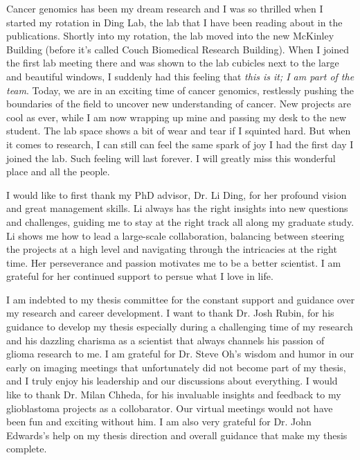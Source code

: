 \thesisacknowledgments

Cancer genomics has been my dream research and I was so thrilled when I started my rotation in Ding Lab, the lab that I have been reading about in the publications.
Shortly into my rotation, the lab moved into the new McKinley Building (before it's called Couch Biomedical Research Building).
When I joined the first lab meeting there and was shown to the lab cubicles next to the large and beautiful windows, I suddenly had this feeling that \textit{this is it; I am part of the team}.
Today, we are in an exciting time of cancer genomics, restlessly pushing the boundaries of the field to uncover new understanding of cancer.
New projects are cool as ever, while I am now wrapping up mine and passing my desk to the new student.
The lab space shows a bit of wear and tear if I squinted hard.
But when it comes to research, I can still can feel the same spark of joy I had the first day I joined the lab.
Such feeling will last forever.
I will greatly miss this wonderful place and all the people.

I would like to first thank my PhD advisor, Dr. Li Ding, for her profound vision and great management skills.
Li always has the right insights into new questions and challenges, guiding me to stay at the right track all along my graduate study.
Li shows me how to lead a large-scale collaboration, balancing between steering the projects at a high level and navigating through the intricacies at the right time.
Her perseverance and passion motivates me to be a better scientist.
I am grateful for her continued support to persue what I love in life.

I am indebted to my thesis committee for the constant support and guidance over my research and career development.
I want to thank Dr. Josh Rubin, for his guidance to develop my thesis especially during a challenging time of my research and his dazzling charisma as a scientist that always channels his passion of glioma research to me.
I am grateful for Dr. Steve Oh's wisdom and humor in our early on imaging meetings that unfortunately did not become part of my thesis, and I truly enjoy his leadership and our discussions about everything.
I would like to thank Dr. Milan Chheda, for his invaluable insights and feedback to my glioblastoma projects as a collobarator. Our virtual meetings would not have been fun and exciting without him. I am also very grateful for Dr. John Edwards's help on my thesis direction and overall guidance that make my thesis complete.

